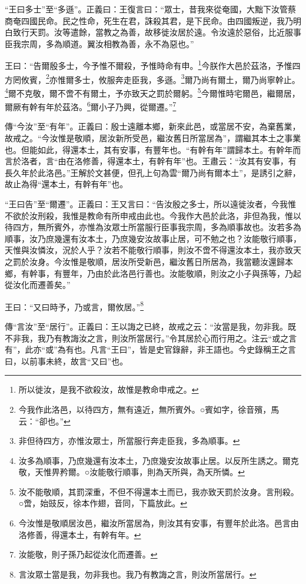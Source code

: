 {\noindent\shu{}\fzkt “王曰多士”至“多遜”。正義曰：王復言曰：“眾士，昔我來從奄國，大黜下汝管蔡商奄四國民命。民之性命，死生在君，誅殺其君，是下民命。由四國叛逆，我乃明白致行天罰。汝等遣餘，當教之為善，故移徙汝居於遠。令汝遠於惡俗，比近服事臣我宗周，多為順道。翼汝相教為善，永不為惡也。” \par}

王曰：“告爾殷多士，今予惟不爾殺，予惟時命有申。\footnote{所以徙汝，是我不欲殺汝，故惟是教命申戒之。}今朕作大邑於茲洛，予惟四方罔攸賓，\footnote{今我作此洛邑，以待四方，無有遠近，無所賓外。○賓如字，徐音殯，馬云：“卻也。”}亦惟爾多士，攸服奔走臣我，多遜。\footnote{非但待四方，亦惟汝眾士，所當服行奔走臣我，多為順事。}爾乃尚有爾土，爾乃尚寧幹止。\footnote{汝多為順事，乃庶幾還有汝本土，乃庶幾安汝故事止居。以反所生誘之。爾克敬，天惟畀矜爾。○汝能敬行順事，則為天所與，為天所憐。}爾不克敬，爾不啻不有爾土，予亦致天之罰於爾躬。\footnote{汝不能敬順，其罰深重，不但不得還本土而已，我亦致天罰於汝身。言刑殺。○啻，始豉反，徐本作翅，音同，下篇放此。}今爾惟時宅爾邑，繼爾居，爾厥有幹有年於茲洛。\footnote{今汝惟是敬順居汝邑，繼汝所當居為，則汝其有安事，有豐年於此洛。邑言由洛修善，得還本土，有幹有年。}爾小子乃興，從爾遷。”\footnote{汝能敬，則子孫乃起從汝化而遷善。}


{\noindent\zhuan{}\fzbyks 傳“今汝”至“有年”。正義曰：殷士遠離本鄉，新來此邑，或當居不安，為棄舊業，故戒之。“今汝惟是敬順，居汝新所受邑，繼汝舊日所當居為”，謂繼其本土之事業也。但能如此，得還本土，其有安事，有豐年也。“有幹有年”謂歸本土。有幹年而言於洛者，言“由在洛修善，得還本土，有幹有年”也。王肅云：“汝其有安事，有長久年於此洛邑。”王解於文甚便，但孔上句為雲“爾乃尚有爾本土”，是誘引之辭，故止為得“還本土，有幹有年”也。 \par}

{\noindent\shu{}\fzkt “王曰告”至“爾遷”。正義曰：王又言曰：“告汝殷之多士，所以遠徙汝者，今我惟不欲於汝刑殺，我惟是教命有所申戒由此也。今我作大邑於此洛，非但為我，惟以待四方，無所賓外，亦惟為汝眾士所當服行臣事我宗周，多為順事故也。汝若多為順事，汝乃庶幾還有汝本土，乃庶幾安汝故事止居，可不勉之也？汝能敬行順事，天惟與汝憐汝，況於人乎？汝若不能敬行順事，則汝不啻不得還汝本土，我亦致天之罰於汝身。今汝惟是敬順，居汝所受新邑，繼汝舊日所居為，我當聽汝還歸本鄉，有幹事，有豐年，乃由於此洛邑行善也。汝能敬順，則汝之小子與孫等，乃起從汝化而遷善矣。” \par}

王曰：“又曰時予，乃或言，爾攸居。”\footnote{言汝眾士當是我，勿非我也。我乃有教誨之言，則汝所當居行。}


{\noindent\zhuan{}\fzbyks 傳“言汝”至“居行”。正義曰：王以誨之已終，故戒之云：“汝當是我，勿非我。既不非我，我乃有教誨汝之言，則汝所當居行。”令其居於心而行用之。注云“或之言有”，此亦“或”為有也。凡言“王曰”，皆是史官錄辭，非王語也。今史錄稱王之言曰，以前事未終，故言“又曰”也。 \par}

